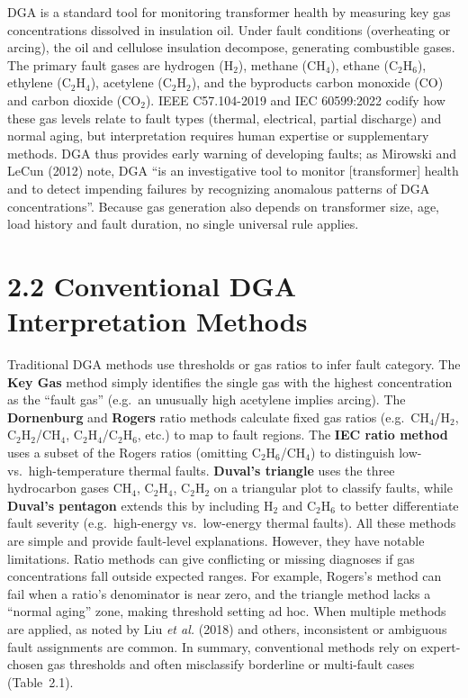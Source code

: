 DGA is a standard tool for monitoring transformer health by measuring
key gas concentrations dissolved in insulation oil. Under fault
conditions (overheating or arcing), the oil and cellulose insulation
decompose, generating combustible gases. The primary fault gases are
hydrogen (H$_2$), methane (CH$_4$), ethane (C$_2$H$_6$), ethylene (C$_2$H$_4$), acetylene
(C$_2$H$_2$), and the byproducts carbon monoxide (CO) and carbon dioxide
(CO$_2$). IEEE C57.104-2019 and IEC 60599:2022 codify how these gas levels
relate to fault types (thermal, electrical, partial discharge) and
normal aging, but interpretation requires human expertise or
supplementary methods. DGA thus provides early warning of developing
faults; as Mirowski and LeCun (2012) note, DGA ``is an investigative
tool to monitor {[}transformer{]} health and to detect impending
failures by recognizing anomalous patterns of DGA concentrations''.
Because gas generation also depends on transformer size, age, load
history and fault duration, no single universal rule applies.

\section{2.2 Conventional DGA Interpretation
Methods}\label{conventional-dga-interpretation-methods}

Traditional DGA methods use thresholds or gas ratios to infer fault
category. The \textbf{Key Gas} method simply identifies the single gas
with the highest concentration as the ``fault gas'' (e.g.~an unusually
high acetylene implies arcing). The \textbf{Dornenburg} and
\textbf{Rogers} ratio methods calculate fixed gas ratios (e.g.~CH$_4$/H$_2$,
C$_2$H$_2$/CH$_4$, C$_2$H$_4$/C$_2$H$_6$, etc.) to map to fault regions. The \textbf{IEC
ratio method} \parencite{IEC60599} uses a subset of the Rogers ratios (omitting
C$_2$H$_6$/CH$_4$) to distinguish low- vs.~high-temperature thermal faults.
\textbf{Duval's triangle} uses the three hydrocarbon gases CH$_4$, C$_2$H$_4$,
C$_2$H$_2$ on a triangular plot to classify faults, while \textbf{Duval's
pentagon} extends this by including H$_2$ and C$_2$H$_6$ to better differentiate
fault severity (e.g.~high-energy vs.~low-energy thermal faults). All
these methods are simple and provide fault-level explanations. However,
they have notable limitations. Ratio methods can give conflicting or
missing diagnoses if gas concentrations fall outside expected ranges.
For example, Rogers's method can fail when a ratio's denominator is near
zero, and the triangle method lacks a ``normal aging'' zone, making
threshold setting ad hoc. When multiple methods are applied, as noted by
Liu \emph{et al.} (2018) and others, inconsistent or ambiguous fault
assignments are common. In summary, conventional methods rely on
expert-chosen gas thresholds and often misclassify borderline or
multi-fault cases (Table~2.1).

